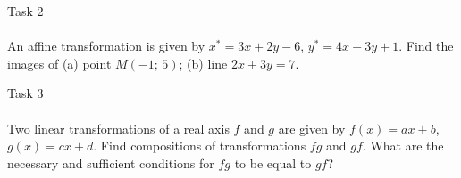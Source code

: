 \documentclass[aspectratio=169]{beamer}
\begin{document}
\begin{frame}[t]{Task 2}
    \framesubtitle{}
    An affine transformation is given by $x^*=3x+2y-6$, $y^*=4x-3y+1$. Find the images of (a) point $M(-1;\,5)$; (b) line $2x+3y=7$.

\end{frame}




\begin{frame}[t]{Task 3}
    \framesubtitle{}
    Two linear transformations of a real axis $f$ and $g$ are given by $f(x)=ax+b$, $g(x)=cx+d$. Find compositions of transformations $fg$ and $gf$. What are the necessary and sufficient conditions for $fg$ to be equal to $gf$?
    
\end{frame}

\end{document}
